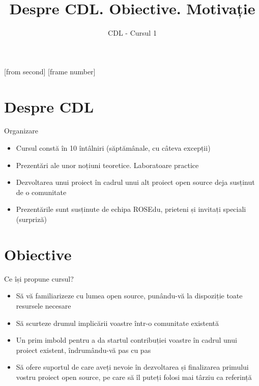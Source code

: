 \documentclass{beamer}
\title{Despre CDL. Obiective. Motivație}
\subtitle{CDL - Cursul 1}
\institute[ROSEdu]{ROSEdu}
\author[Victor]{Victor Cărbune \and Laura Vasilescu \\ {\small victor@rosedu.org \and laura@rosedu.org }}
\begin{document}
[from second]
[frame number]

\frame{\titlepage}

\begin{frame}
\tableofcontents
\end{frame}

\section{Despre CDL}


\begin{frame}{Organizare}
  \begin{itemize} %
  \pause
  \item Cursul constă în 10 întâlniri (săptămânale, cu câteva excepții)
  \pause
  \item Prezentări ale unor noțiuni teoretice. Laboratoare practice
  \pause
  \item Dezvoltarea unui proiect în cadrul unui alt proiect open source deja susținut de o comunitate 
  \pause
  \item Prezentările sunt susținute de echipa ROSEdu, prieteni și invitați speciali (surpriză)
  \end{itemize}
\end{frame}

\section{Obiective}

\begin{frame}{Ce își propune cursul?}
  \begin{itemize} %
  \pause
  \item Să vă familiarizeze cu lumea open source, punându-vă la dispoziție toate resursele necesare
  \pause
  \item Să scurteze drumul implicării voastre într-o comunitate existentă 
  \pause
  \item Un prim imbold pentru a da startul contribuției voastre în cadrul unui proiect existent, îndrumându-vă pas cu pas
  \pause
  \item Să ofere suportul de care aveți nevoie în dezvoltarea și finalizarea primului vostru proiect open source, pe care să îl puteți folosi mai târziu ca referință
  \end{itemize}
\end{frame}
\end{document}
